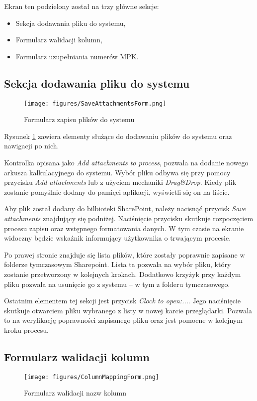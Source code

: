  Ekran ten podzielony został na trzy główne sekcje:
 \begin{itemize}
    \item Sekcja dodawania pliku do systemu,
    \item Formularz walidacji kolumn,
    \item Formularz uzupełniania numerów MPK.
 \end{itemize}

 \subsection*{Sekcja dodawania pliku do systemu}
 \begin{figure}[H]
     \centering
     \texttt{[image: figures/SaveAttachmentsForm.png]}
     \caption{Formularz zapisu plików do systemu}
     \label{fig:SaveAttachmentsForm}
 \end{figure}
 Rysunek \ref{fig:SaveAttachmentsForm} zawiera elementy służące do dodawaniu plików do systemu oraz nawigacji po nich.

 Kontrolka opisana jako \emph{Add attachments to process}, pozwala na dodanie nowego arkusza kalkulacyjnego do systemu. Wybór pliku odbywa się przy pomocy przycisku \emph{Add attachments} lub z użyciem mechaniki \emph{Drag\&Drop}. Kiedy plik zostanie pomyślnie dodany do pamięci aplikacji, wyświetli się on na liście.

 Aby plik został dodany do bilbioteki SharePoint, należy nacisnąć przycisk \emph{Save attachments} znajdujący się podniżej. Naciśnięcie przycisku skutkuje rozpoczęciem procesu zapisu oraz wstępnego formatowania danych. W tym czasie na ekranie widoczny będzie wskaźnik informujący użytkownika o trwającym procesie.

 Po prawej stronie znajduje się lista plików, które zostały poprawnie zapisane w folderze tymczasowym Sharepoint. Lista ta pozwala na wybór pliku, który zostanie przetworzony w kolejnych krokach. Dodatkowo krzyżyk przy każdym pliku pozwala na usunięcie go z systemu -- w tym z folderu tymczasowego.
 
 Ostatnim elementem tej sekcji jest przycisk \emph{Clock to open:...}.
 Jego naciśnięcie skutkuje otwarciem pliku wybranego z listy w nowej karcie przeglądarki. Pozwala to na weryfikację poprawności zapisanego pliku oraz jest pomocne w kolejnym kroku procesu.

\subsection{Formularz walidacji kolumn} 
  \begin{figure}[h]
     \centering
     \texttt{[image: figures/ColumnMappingForm.png]}
     \caption{Formularz walidacji nazw kolumn}
     \label{fig:columnmappingform}
 \end{figure}

